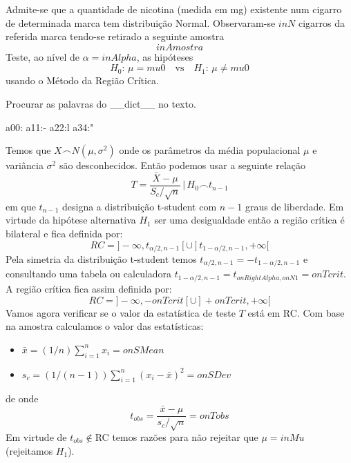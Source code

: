 % 



Admite-se que a quantidade de nicotina (medida em mg) existente num cigarro de determinada marca tem distribuição Normal.
Observaram-se $inN$ cigarros da referida marca tendo-se retirado a seguinte amostra
\[
  inAmostra
\]
Teste, ao nível de $\alpha=inAlpha$, as hipóteses
\[
H_0:\, \mu=mu0 \quad\text{vs}\quad H_1:\, \mu\neq mu0   
\]
usando o Método da Região Crítica.

Procurar as palavras do __dict__ no texto.

a00:
a11:-
a22:l
a34:"%




Temos que $X\frown N(\mu,\sigma^2)$ onde os parâmetros da média populacional $\mu$ e variância $\sigma^2$ são desconhecidos.
Então podemos usar a seguinte relação
\[
T=\frac{\bar X - \mu}{S_c/\sqrt n} \,|\, H_0 \frown t_{n-1}
\]
em que $t_{n-1}$ designa a distribuição t-student com $n-1$ graus de liberdade.
Em virtude da hipótese alternativa $H_1$ ser uma desigualdade então a 
região crítica é bilateral e fica definida por:
\[
RC= ]-\infty,t_{\alpha/2,n-1}[ \cup ]t_{1-\alpha/2,n-1},+\infty[
\]
Pela simetria da distribuição t-student temos
$t_{\alpha/2,n-1} = - t_{1-\alpha/2,n-1}$
e consultando uma tabela ou calculadora $t_{1-\alpha/2,n-1} = t_{onRightAlpha,onN1} = onTcrit$.
A região crítica fica assim definida por:
\[
RC= ]-\infty,-onTcrit[ \cup ]+onTcrit,+\infty[
\]
Vamos agora verificar se o valor da estatística de teste $T$ está em RC.
Com base na amostra calculamos o valor das estatísticas:
\begin{itemize}
\item $\displaystyle \bar x=(1/n)\sum_{i=1}^n x_i=onSMean$ 
\item $\displaystyle s_c=(1/(n-1))\sum_{i=1}^n (x_i-\bar x)^2=onSDev$
\end{itemize}
de onde
\[
t_{obs} = \frac{\bar x - \mu}{s_c/\sqrt n} = onTobs
\]
Em virtude de $t_{obs} \not\in$RC temos razões para não rejeitar que $\mu = inMu$ (rejeitamos $H_1$).



